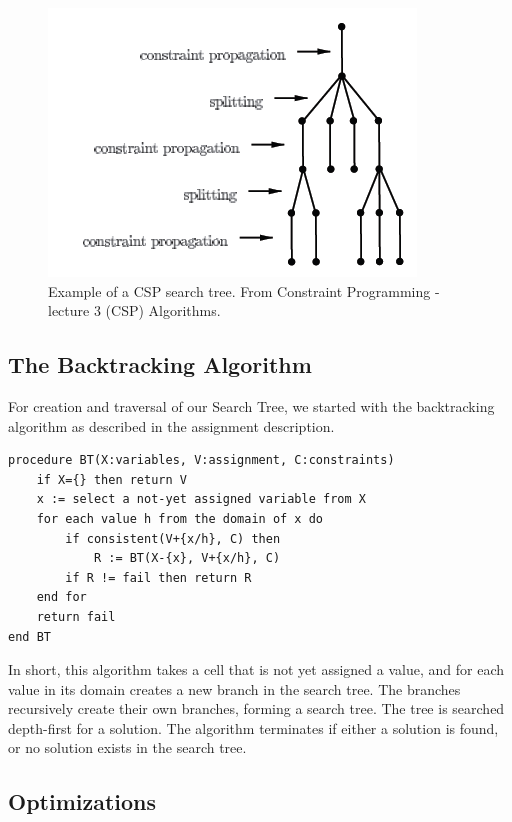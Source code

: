 \documentclass[11pt]{article} %
\begin{document}
\begin{figure}[htbp]
\begin{center}
\includegraphics{tree.png}
\caption{Example of a CSP search tree. From Constraint Programming - lecture 3 (CSP) Algorithms. }
\label{fig:basic_tree}
\end{center}
\end{figure}

\subsection{The Backtracking Algorithm}

For creation and traversal of our Search Tree, we started with the backtracking algorithm as described in the assignment description.

\begin{verbatim}
procedure BT(X:variables, V:assignment, C:constraints)
    if X={} then return V
    x := select a not-yet assigned variable from X
    for each value h from the domain of x do
        if consistent(V+{x/h}, C) then
            R := BT(X-{x}, V+{x/h}, C)
        if R != fail then return R
    end for
    return fail
end BT
\end{verbatim}

In short, this algorithm takes a cell that is not yet assigned a value, and for each value in its domain creates a new branch in the search tree. The branches recursively create their own branches, forming a search tree. The tree is searched depth-first for a solution. The algorithm terminates if either a solution is found, or no solution exists in the search tree.

\subsection{Optimizations}
\end{document}
